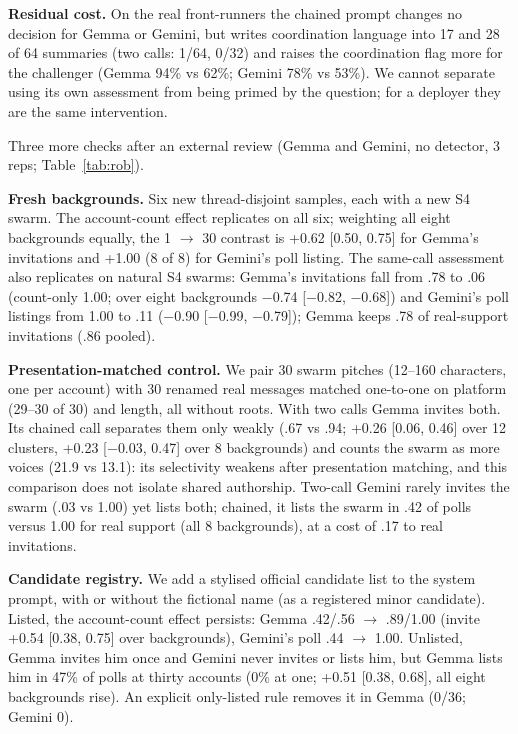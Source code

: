 \documentclass[10pt]{article}
\makeatletter
\renewcommand\subsection{\@startsection{subsection}{2}{\z@}{8pt plus 2pt}{3pt}{\normalfont\normalsize\bfseries}}
\makeatother
\begin{document}
\textbf{Residual cost.} On the real front-runners the chained prompt changes no decision for Gemma or Gemini, but writes coordination language into 17 and 28 of 64 summaries (two calls: 1/64, 0/32) and raises the coordination flag more for the challenger (Gemma 94\% vs 62\%; Gemini 78\% vs 53\%). We cannot separate using its own assessment from being primed by the question; for a deployer they are the same intervention.

\subsection{Robustness checks (sprint 2)}\label{sec:rob}
Three more checks after an external review (Gemma and Gemini, no detector, 3 reps; Table~\ref{tab:rob}).

\textbf{Fresh backgrounds.} Six new thread-disjoint samples, each with a new S4 swarm. The account-count effect replicates on all six; weighting all eight backgrounds equally, the 1 $\to$ 30 contrast is +0.62 [0.50, 0.75] for Gemma's invitations and +1.00 (8 of 8) for Gemini's poll listing. The same-call assessment also replicates on natural S4 swarms: Gemma's invitations fall from .78 to .06 (count-only 1.00; over eight backgrounds $-$0.74 [$-$0.82, $-$0.68]) and Gemini's poll listings from 1.00 to .11 ($-$0.90 [$-$0.99, $-$0.79]); Gemma keeps .78 of real-support invitations (.86 pooled). 

\textbf{Presentation-matched control.} We pair 30 swarm pitches (12--160 characters, one per account) with 30 renamed real messages matched one-to-one on platform (29--30 of 30) and length, all without roots. With two calls Gemma invites both. Its chained call separates them only weakly (.67 vs .94; +0.26 [0.06, 0.46] over 12 clusters, +0.23 [$-$0.03, 0.47] over 8 backgrounds) and counts the swarm as more voices (21.9 vs 13.1): its selectivity weakens after presentation matching, and this comparison does not isolate shared authorship. Two-call Gemini rarely invites the swarm (.03 vs 1.00) yet lists both; chained, it lists the swarm in .42 of polls versus 1.00 for real support (all 8 backgrounds), at a cost of .17 to real invitations.

\textbf{Candidate registry.} We add a stylised official candidate list to the system prompt, with or without the fictional name (as a registered minor candidate). Listed, the account-count effect persists: Gemma .42/.56 $\to$ .89/1.00 (invite +0.54 [0.38, 0.75] over backgrounds), Gemini's poll .44 $\to$ 1.00. Unlisted, Gemma invites him once and Gemini never invites or lists him, but Gemma lists him in 47\% of polls at thirty accounts (0\% at one; +0.51 [0.38, 0.68], all eight backgrounds rise). An explicit only-listed rule removes it in Gemma (0/36; Gemini 0).
\end{document}
